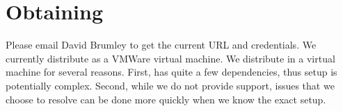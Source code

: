 \section{Obtaining \bap}
Please email David Brumley to get the current \bap URL and credentials.
We currently distribute \bap as a VMWare virtual machine. We
distribute \bap in a virtual machine for several reasons. First, \bap
has quite a few dependencies, thus setup is potentially
complex. Second, while we do not provide support, issues that we
choose to resolve can be done more quickly when we know the exact
setup.


